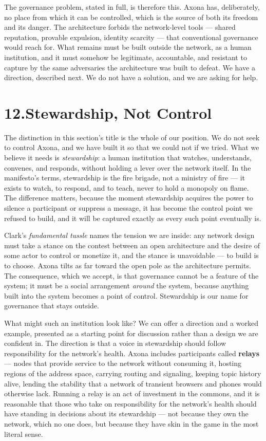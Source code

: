 \documentclass[nobib,justified]{tufte-handout}
\begin{document}
The governance problem, stated in full, is therefore this. Axona has,
deliberately, no place from which it can be controlled, which is the source of
both its freedom and its danger. The architecture forbids the network-level tools
--- shared reputation, provable expulsion, identity scarcity --- that conventional
governance would reach for. What remains must be built outside the network, as a
human institution, and it must somehow be legitimate, accountable, and resistant
to capture by the same adversaries the architecture was built to defeat. We have a
direction, described next. We do not have a solution, and we are asking for help.

\section{12.\quad Stewardship, Not Control}

The distinction in this section's title is the whole of our position. We do not
seek to control Axona, and we have built it so that we could not if we tried.
What we believe it needs is \emph{stewardship}: a human institution that watches,
understands, convenes, and responds, without holding a lever over the network
itself. In the manifesto's terms, stewardship is the fire brigade, not a
ministry of fire --- it exists to watch, to respond, and to teach, never to
hold a monopoly on flame. The difference matters, because the moment stewardship acquires the power
to silence a participant or suppress a message, it has become the control point we
refused to build, and it will be captured exactly as every such point eventually
is.

Clark's \emph{fundamental tussle} names the tension we are inside: any network
design must take a stance on the contest between an open architecture and the
desire of some actor to control or monetize it, and the stance is unavoidable ---
to build is to choose. Axona tilts as far toward the open pole as the architecture
permits. The consequence, which we accept, is that governance cannot be a feature
of the system; it must be a social arrangement \emph{around} the system, because
anything built into the system becomes a point of control. Stewardship is our name
for governance that stays outside.

What might such an institution look like? We can offer a direction and a worked
example, presented as a starting point for discussion rather than a design we are
confident in. The direction is that a voice in stewardship should follow
responsibility for the network's health. Axona includes participants called
\textbf{relays} --- nodes that provide service to the network without consuming
it, hosting regions of the address space, carrying routing and signaling, keeping
topic history alive, lending the stability that a network of transient browsers
and phones would otherwise lack. Running a relay is an act of investment in the
commons, and it is reasonable that those who take on responsibility for the
network's health should have standing in decisions about its stewardship --- not
because they own the network, which no one does, but because they have skin in the
game in the most literal sense.
\end{document}
